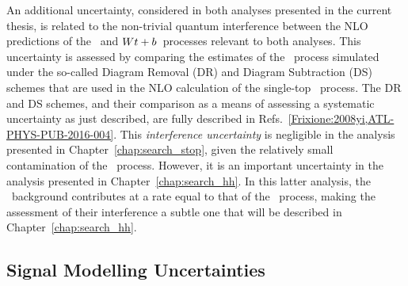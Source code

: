 An additional uncertainty, considered in both analyses presented in the current thesis, is related
to the non-trivial quantum interference between the NLO predictions of the \ttbar~and $Wt+b$~processes relevant
to both analyses.
This uncertainty is assessed by comparing the estimates of the \wt~process simulated
under the so-called Diagram Removal (DR) and Diagram Subtraction (DS) schemes that
are used in the NLO calculation of the single-top \wt~process.
The DR and DS schemes, and their comparison as a means of assessing a systematic uncertainty
as just described, are fully described in Refs.~\ref{Frixione:2008yi,ATL-PHYS-PUB-2016-004}.
This \textit{interference uncertainty} is negligible in the analysis presented in Chapter~\ref{chap:search_stop},
given the relatively small contamination of the \wt~process.
However, it is an important uncertainty in the analysis presented in Chapter~\ref{chap:search_hh}.
In this latter analysis, the \wt~background contributes at a rate equal to that of the \ttbar~process, making
the assessment of their interference a subtle one that will be described in Chapter~\ref{chap:search_hh}.

%
%

\subsection{Signal Modelling Uncertainties}
\label{sec:syst_sig_modelling}

